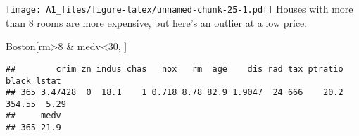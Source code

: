 \documentclass[
]{article}
\newenvironment{Shaded}{\begin{snugshade}}{\end{snugshade}}
\newcommand{\DecValTok}[1]{\textcolor[rgb]{0.00,0.00,0.81}{#1}}
\newcommand{\NormalTok}[1]{#1}
\newcommand{\SpecialCharTok}[1]{\textcolor[rgb]{0.00,0.00,0.00}{#1}}
\begin{document}
\texttt{[image: A1\_files/figure-latex/unnamed-chunk-25-1.pdf]} Houses
with more than 8 rooms are more expensive, but here's an outlier at a
low price.

\begin{Shaded}
\begin{Highlighting}[]
\NormalTok{Boston[rm}\SpecialCharTok{\textgreater{}}\DecValTok{8} \SpecialCharTok{\&}\NormalTok{ medv}\SpecialCharTok{\textless{}}\DecValTok{30}\NormalTok{, ]}
\end{Highlighting}
\end{Shaded}

\begin{verbatim}
##        crim zn indus chas   nox   rm  age    dis rad tax ptratio  black lstat
## 365 3.47428  0  18.1    1 0.718 8.78 82.9 1.9047  24 666    20.2 354.55  5.29
##     medv
## 365 21.9
\end{verbatim}
\end{document}
